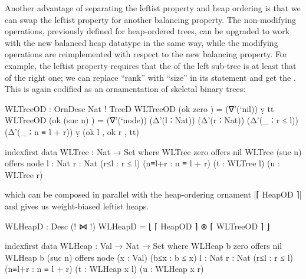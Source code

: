 Another advantage of separating the leftist property and heap ordering is that we can swap the leftist property for another balancing property.
The non-modifying operations, previously defined for heap-ordered trees, can be upgraded to work with the new balanced heap datatype in the same way, while the modifying operations are reimplemented with respect to the new balancing property.
For example, the leftist property requires that the  of the left sub-tree is at least that of the right one; we can replace ``rank'' with ``size'' in its statement and get the .
This is again codified as an ornamentation of skeletal binary trees:
\begin{code}
WLTreeOD : OrnDesc Nat ! TreeD
WLTreeOD (ok zero     )  =  (∇'(`nil)) ṿ tt
WLTreeOD (ok (suc n)  )  =  (∇'(`node)) (Δ'(l ∶ Nat)) (Δ'(r ∶ Nat))
                              (Δ'(_ ∶ r ≤ l)) (Δ'(_ ∶ n ≡ l + r)) ṿ (ok l , ok r , tt)

indexfirst data WLTree : Nat → Set where
  WLTree zero     offers   nil
  WLTree (suc n)  offers   node  {l : Nat} {r : Nat}
                                 (r≤l : r ≤ l) (n≡l+r : n ≡ l + r)
                                 (t : WLTree l) (u : WLTree r)
\end{code}
which can be composed in parallel with the heap-ordering ornament |⌈ HeapOD ⌉| and gives us weight-biased leftist heaps.
\begin{code}
WLHeapD : Desc (! ⋈ !)
WLHeapD = ⌊ ⌈ HeapOD ⌉ ⊗ ⌈ WLTreeOD ⌉ ⌋

indexfirst data WLHeap : Val → Nat → Set where
  WLHeap b zero     offers  nil
  WLHeap b (suc n)  offers  node  (x : Val) (b≤x : b ≤ x)
                                  {l : Nat} {r : Nat}
                                  (r≤l : r ≤ l) (n≡l+r : n ≡ l + r)
                                  (t : WLHeap x l) (u : WLHeap x r)
\end{code}

